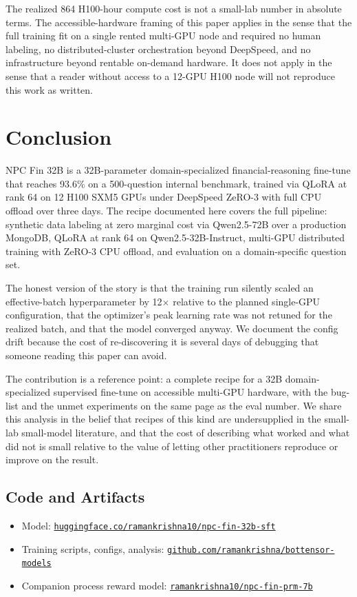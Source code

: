\documentclass[10pt,letterpaper]{article}
\begin{document}
The realized 864 H100-hour compute cost is not a small-lab number in absolute terms. The accessible-hardware framing of this paper applies in the sense that the full training fit on a single rented multi-GPU node and required no human labeling, no distributed-cluster orchestration beyond DeepSpeed, and no infrastructure beyond rentable on-demand hardware. It does not apply in the sense that a reader without access to a 12-GPU H100 node will not reproduce this work as written.

\section{Conclusion}

NPC Fin 32B is a 32B-parameter domain-specialized financial-reasoning fine-tune that reaches 93.6\% on a 500-question internal benchmark, trained via QLoRA at rank 64 on 12 H100 SXM5 GPUs under DeepSpeed ZeRO-3 with full CPU offload over three days. The recipe documented here covers the full pipeline: synthetic data labeling at zero marginal cost via Qwen2.5-72B over a production MongoDB, QLoRA at rank 64 on Qwen2.5-32B-Instruct, multi-GPU distributed training with ZeRO-3 CPU offload, and evaluation on a domain-specific question set.

The honest version of the story is that the training run silently scaled an effective-batch hyperparameter by 12$\times$ relative to the planned single-GPU configuration, that the optimizer's peak learning rate was not retuned for the realized batch, and that the model converged anyway. We document the config drift because the cost of re-discovering it is several days of debugging that someone reading this paper can avoid.

The contribution is a reference point: a complete recipe for a 32B domain-specialized supervised fine-tune on accessible multi-GPU hardware, with the bug-list and the unmet experiments on the same page as the eval number. We share this analysis in the belief that recipes of this kind are undersupplied in the small-lab small-model literature, and that the cost of describing what worked and what did not is small relative to the value of letting other practitioners reproduce or improve on the result.

\subsection*{Code and Artifacts}

\begin{itemize}[leftmargin=*,itemsep=0pt]
\item Model: \href{https://huggingface.co/ramankrishna10/npc-fin-32b-sft}{\texttt{huggingface.co/ramankrishna10/npc-fin-32b-sft}}
\item Training scripts, configs, analysis: \href{https://github.com/ramankrishna/bottensor-models/tree/main/training/npc-fin-32b}{\texttt{github.com/ramankrishna/bottensor-models}}
\item Companion process reward model: \href{https://huggingface.co/ramankrishna10/npc-fin-prm-7b}{\texttt{ramankrishna10/npc-fin-prm-7b}}
\end{itemize}
\end{document}
